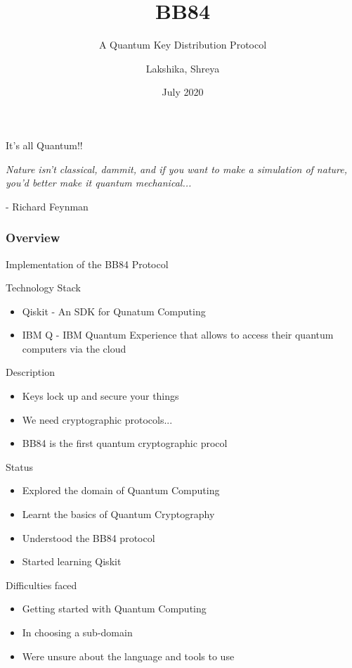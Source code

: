 \documentclass[14 pt]{beamer}
\title[BB84]{BB84}
\subtitle{A Quantum Key Distribution Protocol}
\author[Team 37]{Lakshika, Shreya}
\date{July 2020}
\begin{document}
\begin{frame}
	\titlepage
\end{frame}

\begin{frame}{It's all Quantum!!}
    \begin{center}
        \emph{Nature isn’t classical, dammit,
and if you want to make a simulation of nature, you’d better make it quantum mechanical...}
    \end{center}
    \begin{flushright}
        - Richard Feynman
    \end{flushright}
\end{frame}


\begin{frame}
	\frametitle{Overview}
	 Implementation of the BB84 Protocol
\end{frame}

\begin{frame}{Technology Stack}
	\begin{itemize}
		\item Qiskit - An SDK for Qunatum Computing
		\item IBM Q - IBM Quantum Experience that allows to access their quantum computers via the cloud
	\end{itemize}
\end{frame}

\begin{frame}{Description}
    \begin{itemize}[<+->] 
        \item Keys lock up and secure your things
        \item We need cryptographic protocols...
        \item BB84 is the first quantum cryptographic procol
    \end{itemize}
\end{frame}

\begin{frame}{Status}
	\begin{itemize}
		\item Explored the domain of Quantum Computing
        \item Learnt the basics of Quantum Cryptography
        \item Understood the BB84 protocol
        \item Started learning Qiskit
	\end{itemize}
\end{frame}

\begin{frame}{Difficulties faced}
	\begin{itemize}
		\item Getting started with Quantum Computing
        \item In choosing a sub-domain
        \item Were unsure about the language and tools to use
	\end{itemize}
\end{frame}
		
\end{document}
